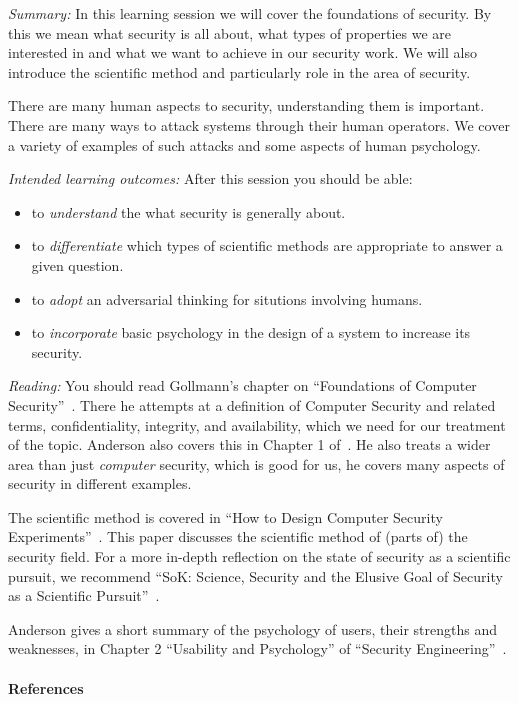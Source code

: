 \emph{Summary:}
In this learning session we will cover the foundations of security.
By this we mean what security is all about, \eg what types of properties we are 
interested in and what we want to achieve in our security work.
We will also introduce the scientific method and particularly role in the area 
of security.

There are many human aspects to security, understanding them is important.
There are many ways to attack systems through their human operators.
We cover a variety of examples of such attacks and some aspects of human 
psychology.

\emph{Intended learning outcomes:}
After this session you should be able:
\begin{itemize}
  \item to \emph{understand} the what security is generally about.
  \item to \emph{differentiate} which types of scientific methods are 
    appropriate to answer a given question.
  \item to \emph{adopt} an adversarial thinking for situtions involving humans.
  \item to \emph{incorporate} basic psychology in the design of a system to 
    increase its security.
\end{itemize}

\emph{Reading:}
You should read Gollmann's chapter on \enquote{Foundations of Computer 
  Security}~\cite[Ch.~3]{Gollmann2011cs}.
There he attempts at a definition of Computer Security and related terms, \eg 
confidentiality, integrity, and availability, which we need for our treatment of 
the topic.
Anderson also covers this in Chapter 1 of~\cite{Anderson2008sea}.
He also treats a wider area than just \emph{computer} security, which is good 
for us, he covers many aspects of security in different examples.

The scientific method is covered in \enquote{How to Design Computer Security 
  Experiments}~\cite{HowToDesignSecurityExperiments}.
This paper discusses the scientific method of (parts of) the security field.
For a more in-depth reflection on the state of security as a scientific 
pursuit, we recommend \enquote{SoK: Science, Security and the Elusive Goal of 
  Security as a Scientific Pursuit}~\cite{SecurityAsAScience}.

Anderson gives a short summary of the psychology of users, their strengths and 
weaknesses, in Chapter 2 \enquote{Usability and Psychology} of 
\enquote{Security Engineering}~\cite{Anderson2008sea}.

\paragraph{References}
